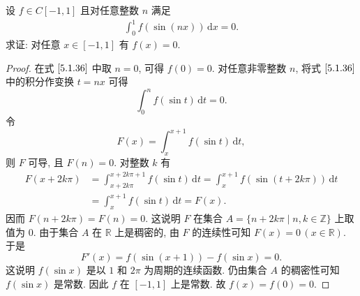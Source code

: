 \documentclass[../../main.tex]{subfiles}
\begin{document}
\begin{example}
设 \( f \in C[-1,1] \) 且对任意整数 \( n \) 满足  
\begin{align}
\int_{0}^{1} f(\sin(nx)) \, \mathrm{d}x = 0. \label{5.1.36}
\end{align}  
求证: 对任意 \( x \in [-1,1] \) 有 \( f(x) = 0 \).  
\end{example}
\begin{proof}
在式 \(\eqref{5.1.36}\) 中取 \( n = 0 \), 可得 \( f(0) = 0 \). 对任意非零整数 \( n \), 将式 \(\eqref{5.1.36}\) 中的积分作变换 \( t = nx \) 可得  
\[
\int_{0}^{n} f(\sin t) \, \mathrm{d}t = 0.
\]  
令 
\[
F(x) = \int_{x}^{x + 1} f(\sin t) \, \mathrm{d}t,
\]  
则 \( F \) 可导, 且 \( F(n) = 0 \). 对整数 \( k \) 有  
\[
\begin{aligned}
F(x + 2k\pi) &= \int_{x + 2k\pi}^{x + 2k\pi + 1} f(\sin t) \, \mathrm{d}t = \int_{x}^{x + 1} f(\sin(t + 2k\pi)) \, \mathrm{d}t \\
&= \int_{x}^{x + 1} f(\sin t) \, \mathrm{d}t = F(x).
\end{aligned}
\]  
因而 \( F(n + 2k\pi) = F(n) = 0 \). 这说明 \( F \) 在集合 \( A = \{ n + 2k\pi \mid n, k \in \mathbb{Z} \} \) 上取值为 \( 0 \). 由于集合 \( A \) 在 \( \mathbb{R} \) 上是稠密的, 由 \( F \) 的连续性可知 \( F(x) = 0 \, (x \in \mathbb{R}) \). 于是  
\[
F'(x) = f(\sin(x + 1)) - f(\sin x) = 0.
\]  
这说明 \( f(\sin x) \) 是以 \( 1 \) 和 \( 2\pi \) 为周期的连续函数. 仍由集合 \( A \) 的稠密性可知 \( f(\sin x) \) 是常数. 因此 \( f \) 在 \( [-1,1] \) 上是常数. 故 \( f(x) = f(0) = 0 \).

\end{proof}
\end{document}

